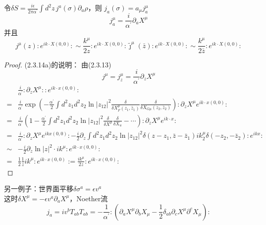 令$\delta S=\frac{i \epsilon}{2 \pi \alpha^\prime} \int d^{2} z \, j^{a}(\sigma)  \partial _a \rho$，则
$j_{a}(\sigma)=a_{\mu} j_{a}^{\mu}$
\begin{equation}
j_{a}^{\mu}=\frac{i}{\alpha^{\prime}} \partial_{a} X^{\mu}
\end{equation}
并且
\begin{subequations}
\begin{equation}
j^{\mu}(z): e^{i k \cdot X(0,0)}: \sim \frac{k^{\mu}}{2 z}: e^{i k \cdot X(0,0)}:
\end{equation}
\begin{equation}
\tilde{\jmath}^{\mu}(\bar{z}): e^{i k \cdot X(0,0)}: \sim \frac{k^{\mu}}{2 \bar{z}}: e^{i k \cdot X(0,0)}:
\end{equation}
\end{subequations}

\begin{proof}
(2.3.14a)的说明：
由(2.3.13)
$$
j^{\mu}=j_{z}^{\mu}=\frac{i}{\alpha^{\prime}} \partial_{z} X^{\mu}
$$
$$
\begin{aligned}
& \frac{i}{\alpha^{\prime}}: \partial_{z}X^{\mu}: : e^{i k \cdot x(0,0)}: \\
=& \frac{i}{\alpha^{\prime}} \exp \left(-\frac{\alpha^{\prime}}{2} \int d^{2} z_{1} d^{2} z_{2} \ln \left|z_{12}\right|^{2} \frac{\delta}{\delta X_{F}^{\mu}\left(z_{1}, \bar{z}_{1}\right)} \frac{\delta}{\delta X_{G{\mu}}\left(z_{2}, \bar{z}_{2}\right)}\right): \partial_{z}X^{\mu} e^{i k \cdot x(0,0)}: \\
=& \frac{i}{\alpha^{\prime}}\left(1-\frac{\alpha^{\prime}}{2} \int d^{2} z_{1} d^{2} z_{2} \ln \left|z_{12}\right|^{2} \frac{\delta}{\delta X^{\mu}} \frac{\delta}{\delta X_{u}}-\cdots\right) : \partial_{z} X^{\mu} e^{i k \cdot x}:\\
=&\frac{i}{\alpha^{\prime}}: \partial_{z} X^{\mu} e^{i k  x(0,0)}:-\frac{i}{2} \partial_{z} \int d^{2} z_{1} d^{2} z_{2} \ln \left|z_{12}\right|^{2} \delta\left(z-z_{1}, \bar{z}-\bar{z}_{1}\right)  i k_{2}^{\mu} \delta\left(-z_{2}, -\bar{z}_{2}\right):e^{ikx}:\\
\sim&-\frac{i}{2} \partial_{z} \ln |z|^{2} \cdot i k^{\mu}: e^{i k \cdot x(0,0)}: \\
=&\frac{1}{2} \frac{1}{z} i k^{\mu}: e^{i k \cdot x(0,0)}:=\frac{i k^{\mu}}{2 z}: e^{i k \cdot x(0,0)}:
\end{aligned}
$$
\end{proof}

另一例子：世界面平移$\delta \sigma^{a}=\epsilon v^{a}$\\
这时$\delta X^{\mu}=-\epsilon v^{a} \partial_{a} X^{\mu}$，Noether流
\begin{subequations}
\begin{equation}\label{2.3.15a}
j_{a}=i v^{b} T_{a b}
\end{equation}
\begin{equation}
T_{a b}=-\frac{1}{\alpha^{\prime}}:\left(\partial_{a} X^{\mu} \partial_{b} X_{\mu}-\frac{1}{2} \delta_{a b} \partial_{c} X^{\mu} \partial^{c} X_{\mu}\right):
\end{equation}
\end{subequations}

